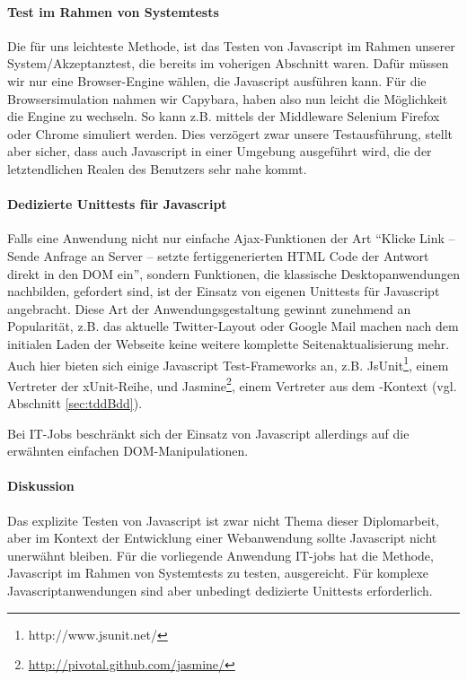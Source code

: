 \paragraph{Test im Rahmen von Systemtests} Die für uns leichteste Methode, ist das Testen von Javascript im Rahmen unserer System/Akzeptanztest, die bereits im voherigen Abschnitt waren. Dafür müssen wir nur eine Browser-Engine wählen, die Javascript ausführen kann. Für die Browsersimulation nahmen wir Capybara, haben also nun leicht die Möglichkeit die Engine zu wechseln. So kann z.B. mittels der Middleware Selenium Firefox oder Chrome simuliert werden. Dies verzögert zwar unsere Testausführung, stellt aber sicher, dass auch Javascript in einer Umgebung ausgeführt wird, die der letztendlichen Realen des Benutzers sehr nahe kommt.

\paragraph{Dedizierte Unittests für Javascript} Falls eine Anwendung nicht nur einfache Ajax-Funktionen der Art "`Klicke Link -- Sende Anfrage an Server -- setzte fertiggenerierten HTML Code der Antwort direkt in den DOM ein"', sondern Funktionen, die klassische Desktopanwendungen nachbilden, gefordert sind, ist der Einsatz von eigenen Unittests für Javascript angebracht.
Diese Art der Anwendungsgestaltung gewinnt zunehmend an Popularität, z.B. das aktuelle Twitter-Layout oder Google Mail machen nach dem initialen Laden der Webseite keine weitere komplette Seitenaktualisierung mehr. 
Auch hier bieten sich einige Javascript Test-Frameworks an, z.B. JsUnit\footnote{http://www.jsunit.net/}, einem Vertreter der xUnit-Reihe, und Jasmine\footnote{\url{http://pivotal.github.com/jasmine/}}, einem Vertreter aus dem -Kontext (vgl. Abschnitt \ref{sec:tddBdd}). 

Bei IT-Jobs beschränkt sich der Einsatz von Javascript allerdings auf die erwähnten einfachen DOM-Manipulationen.

\paragraph{Diskussion} Das explizite Testen von Javascript ist zwar nicht Thema dieser Diplomarbeit, aber im Kontext der Entwicklung einer Webanwendung sollte Javascript nicht unerwähnt bleiben. Für die vorliegende Anwendung IT-jobs hat die Methode, Javascript im Rahmen von Systemtests zu testen, ausgereicht. Für komplexe Javascriptanwendungen sind aber unbedingt dedizierte Unittests erforderlich.
